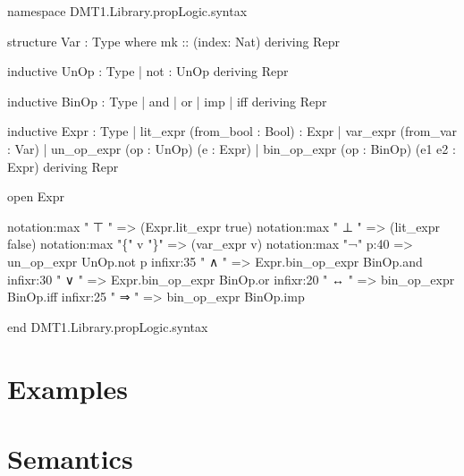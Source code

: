 \documentclass{book}
\newenvironment{Shaded}{\begin{snugshade}}{\end{snugshade}}
\newcommand{\NormalTok}[1]{#1}
\begin{document}
\begin{Shaded}
\begin{Highlighting}[]
\NormalTok{namespace DMT1.Library.propLogic.syntax}

\NormalTok{structure Var : Type where}
\NormalTok{  mk :: (index: Nat)}
\NormalTok{deriving Repr}

\NormalTok{inductive UnOp : Type}
\NormalTok{| not : UnOp}
\NormalTok{deriving Repr}

\NormalTok{inductive BinOp : Type}
\NormalTok{| and}
\NormalTok{| or}
\NormalTok{| imp}
\NormalTok{| iff}
\NormalTok{deriving Repr}

\NormalTok{inductive Expr : Type}
\NormalTok{| lit\_expr (from\_bool : Bool) : Expr}
\NormalTok{| var\_expr (from\_var : Var)}
\NormalTok{| un\_op\_expr (op : UnOp) (e : Expr)}
\NormalTok{| bin\_op\_expr (op : BinOp) (e1 e2 : Expr)}
\NormalTok{deriving Repr}

\NormalTok{open Expr}

\NormalTok{notation:max " ⊤ " =\textgreater{} (Expr.lit\_expr true)}
\NormalTok{notation:max " ⊥ " =\textgreater{} (lit\_expr false)}
\NormalTok{notation:max "\{" v "\}" =\textgreater{} (var\_expr v)}
\NormalTok{notation:max "¬" p:40 =\textgreater{} un\_op\_expr UnOp.not p}
\NormalTok{infixr:35 " ∧ "  =\textgreater{}  Expr.bin\_op\_expr BinOp.and}
\NormalTok{infixr:30 " ∨  "  =\textgreater{} Expr.bin\_op\_expr BinOp.or}
\NormalTok{infixr:20 " ↔ " =\textgreater{} bin\_op\_expr BinOp.iff}
\NormalTok{infixr:25 " ⇒ " =\textgreater{} bin\_op\_expr BinOp.imp}

\NormalTok{end DMT1.Library.propLogic.syntax}
\end{Highlighting}
\end{Shaded}

\hypertarget{book__pandoc__debug__src__dmt1__lectures__l02_proplogic__formal__axioms.lean.md}{}
\hypertarget{book__pandoc__debug__src__dmt1__lectures__l02_proplogic__formal__axioms.lean.md__examples}{%
\section{Examples}\label{book__pandoc__debug__src__dmt1__lectures__l02_proplogic__formal__axioms.lean.md__examples}}

\hypertarget{book__pandoc__debug__src__dmt1__lectures__l02_proplogic__formal__semantics.lean.md}{}
\hypertarget{book__pandoc__debug__src__dmt1__lectures__l02_proplogic__formal__semantics.lean.md__semantics}{%
\section{Semantics}\label{book__pandoc__debug__src__dmt1__lectures__l02_proplogic__formal__semantics.lean.md__semantics}}
\end{document}
